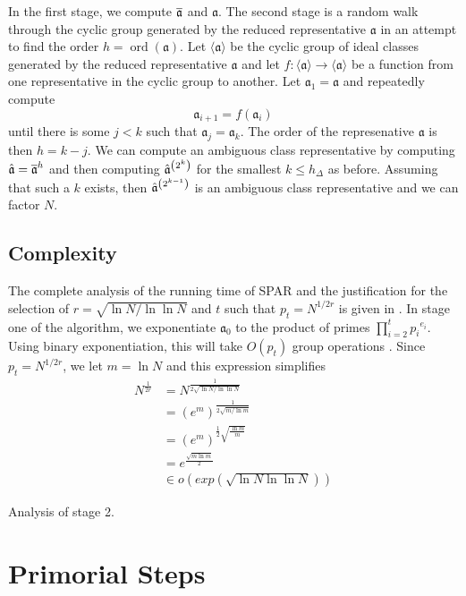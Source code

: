 \documentclass{ucalgthes1}
\theoremstyle{plain}
\theoremstyle{definition}
\DeclareMathOperator{\ord}{ord}
\begin{document}
In the first stage, we compute $\overline{\mathfrak a}$ and $\mathfrak a$.  The second stage is a random walk through the cyclic group generated by the reduced representative $\mathfrak a$ in an attempt to find the order $h = \ord(\mathfrak a)$.  Let $\langle \mathfrak a \rangle$ be the cyclic group of ideal classes generated by the reduced representative $\mathfrak a$ and let $f : \langle \mathfrak a \rangle \rightarrow \langle \mathfrak a \rangle$ be a function from one representative in the cyclic group to another.  Let $\mathfrak a_1 = \mathfrak a$ and repeatedly compute
\[
	\mathfrak a_{i+1} = f(\mathfrak a_i)
\]
until there is some $j < k$ such that $\mathfrak a_j = \mathfrak a_k$.  The order of the represenative $\mathfrak a$ is then $h = k - j$.  We can compute an ambiguous class representative by computing $\hat{\mathfrak a} = \overline{\mathfrak a}^h$ and then computing ${\hat{\mathfrak a}}^{\left(2^k\right)}$ for the smallest $k \le h_\Delta$ as before.  Assuming that such a $k$ exists, then ${\hat{\mathfrak a}}^{\left(2^{k-1}\right)}$ is an ambiguous class representative and we can factor $N$.

\subsection{Complexity}

The complete analysis of the running time of SPAR and the justification for the selection of $r = \sqrt{\ln N / \ln \ln N}$ and $t$ such that $p_t = N^{1/2r}$ is given in \cite{Schnorr1984}.  In stage one of the algorithm, we exponentiate $\mathfrak a_0$ to the product of primes $\prod_{i=2}^t {p_i}^{e_i}$.  Using binary exponentiation, this will take $O(p_t)$ group operations \cite[p.290]{Schnorr1984}.  Since $p_t = N^{1/2r}$, we let $m = \ln N$ and this expression simplifies
\begin{align*}
	N^\frac{1}{2r} &= N^\frac{1}{2\sqrt{\ln N / \ln \ln N}} \\
	&= {\left(e^m\right)}^\frac{1}{2\sqrt{m / \ln m}} \\
	&= {\left(e^m\right)}^{\frac{1}{2} \sqrt{\frac{\ln m}{m}}} \\
	&= e^{\frac{\sqrt{m \ln m}}{2}} \\
	&\in o(exp(\sqrt{\ln N \ln \ln N}))
\end{align*}

Analysis of stage 2.

\section{Primorial Steps}
\end{document}
